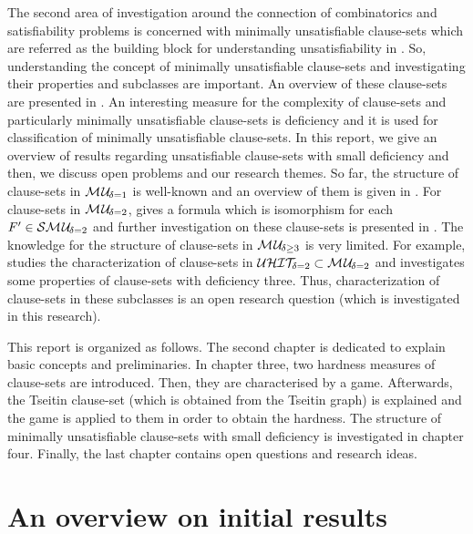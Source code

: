 \documentclass{report}
\begin{document}
The second area of investigation around the connection of combinatorics and satisfiability problems is concerned with minimally unsatisfiable clause-sets which are referred as the building block for understanding unsatisfiability in \cite{KullmannZhao2010Extremal}. So, understanding the concept of minimally unsatisfiable clause-sets and investigating their properties and subclasses are important. An overview of these clause-sets are presented in \cite{KullmannZhao2010Extremal, Kullmann2007HandbuchMU,KullmannZhao2012ConfluenceJ}. An interesting measure for the complexity of clause-sets and particularly minimally unsatisfiable clause-sets is deficiency and it is used for classification of minimally unsatisfiable clause-sets. In this report, we give an overview of results regarding unsatisfiable clause-sets with small deficiency and then, we discuss open problems and our research themes. So far, the structure of clause-sets in $\mathcal{M\hspace{0.8pt}U}_{\!\delta=1}$ is well-known and an overview of them is given in \cite{KullmannZhao2010Extremal, Ku99dK,KleineBuening2000SubclassesMU,DDK98}. For clause-sets in $\mathcal{M\hspace{0.8pt}U}_{\!\delta=2}$, \cite{KleineBuening2000SubclassesMU} gives a formula which is isomorphism for each $F' \in \mathcal{S}\mathcal{M\hspace{0.8pt}U}_{\!\delta=2}$ and further investigation on these clause-sets is presented in \cite{KullmannZhao2010Extremal, KleineBuening2000SubclassesMU, KullmannZhao2012ConfluenceJ}. The knowledge for the structure of clause-sets in $\mathcal{M\hspace{0.8pt}U}_{\!\delta \ge 3}$ is very limited. For example, \cite{KullmannZhao2016UHitSAT} studies the characterization of clause-sets in $\mathcal{U}\mathcal{HIT}_{\!\!\delta=2} \subset \mathcal{M\hspace{0.8pt}U}_{\!\delta=2}$ and \cite{KullmannZhao2010Extremal} investigates some properties of clause-sets with deficiency three. Thus, characterization of clause-sets in these subclasses is an open research question (which is investigated in this research).

This report is organized as follows. The second chapter is dedicated to explain basic concepts and preliminaries. In chapter three, two hardness measures of clause-sets are introduced. Then, they are characterised by a game. Afterwards, the Tseitin clause-set (which is obtained from the Tseitin graph) is explained and the game is applied to them in order to obtain the hardness. The structure of minimally unsatisfiable clause-sets with small deficiency is investigated in chapter four. Finally, the last chapter contains open questions and research ideas.

\section{An overview on initial results}
\label{sec:init-results}
 
\end{document}
